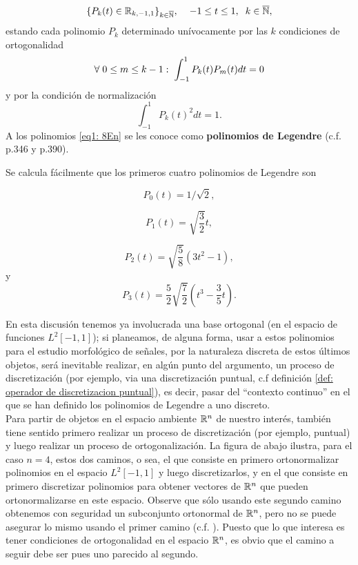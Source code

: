 \begin{equation}
\label{eq1: 8En}
\{ P_{k}(t)\in \mathbb{R}_{k, -1,1}\}_{k \in \overline{\mathbb{N}}}, \hspace{0.4cm}
-1 \leq t \leq 1, \hspace{0.2cm}
 k \in \overline{\mathbb{N}},
\end{equation}
estando cada polinomio $P_{k}$ determinado unívocamente
por las $k$ condiciones de ortogonalidad
\[
\forall \hspace{0.1cm} 0 \leq m \leq k-1: \hspace{0.1cm}
\int_{-1}^{1}{P_{k}(t)P_{m}(t)} dt = 0
\]
y por la condición de normalización 
\[
\int_{-1}^{1}{P_{k}(t)^{2}} dt = 1.
\]
A los polinomios \eqref{eq1: 8En}
se les conoce como \textbf{polinomios de Legendre}
 (c.f. \cite{friedberg} p.346
y \cite{DSML} p.390).

Se calcula fácilmente que los primeros cuatro 
polinomios de Legendre son

\[
P_{0}(t) = 1/\sqrt{2},
\]

\[
P_{1}(t) = \sqrt{\frac{3}{2}}t,
\]

\[
P_{2}(t) = \sqrt{\frac{5}{8}}\left( 3t^{2}-1 \right),
\]
y
\[
P_{3}(t) = \frac{5}{2} \sqrt{\frac{7}{2}}\left( t^{3}- \frac{3}{5}t\right).
\]

En esta discusión tenemos ya involucrada una base ortogonal
(en el espacio de funciones $L^{2}[-1,1]$);
si planeamos, de alguna forma, usar a estos polinomios
para el estudio morfológico de señales, por la naturaleza
discreta de estos últimos objetos, será
inevitable realizar, en algún punto 
del argumento, un proceso de discretización
(por ejemplo, 
via una discretización
puntual, c.f definición \ref{def: operador de discretizacion puntual}), es decir,
pasar del ``contexto continuo'' en el que se han
definido los polinomios de Legendre a uno discreto. \\

Para partir de
objetos en el espacio ambiente
$\mathbb{R}^{n}$ de nuestro interés,
también tiene sentido primero realizar
un proceso de discretización (por ejemplo, 
puntual) y luego realizar
un proceso de ortogonalización. La figura
de abajo
ilustra, para el caso $n=4$, estos dos caminos,
o sea, el que consiste en primero ortonormalizar
polinomios en el espacio $L^{2}[-1,1]$ y luego discretizarlos,
y en el que consiste en primero discretizar polinomios
para obtener vectores de $\mathbb{R}^{n}$ que pueden ortonormalizarse
en este espacio. Observe que sólo usando este segundo camino 
obtenemos con seguridad un subconjunto ortonormal de $\mathbb{R}^{n}$,
pero no se puede asegurar lo mismo usando el primer camino
(c.f. \cite{stockel}).
Puesto que lo
que interesa es tener condiciones de ortogonalidad
en el espacio $\mathbb{R}^{n}$, es obvio que 
el camino a seguir debe ser pues uno parecido al segundo. \\


